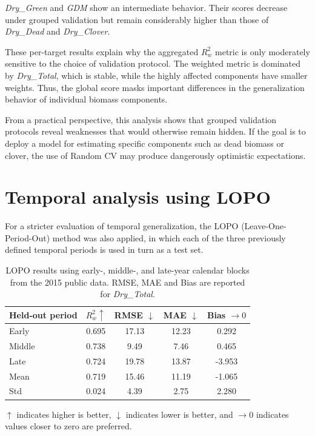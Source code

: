 \textit{Dry\_Green} and \textit{GDM} show an intermediate behavior. Their scores decrease under grouped validation but remain considerably higher than those of \textit{Dry\_Dead} and \textit{Dry\_Clover}.

These per-target results explain why the aggregated $R^2_w$ metric is only moderately sensitive to the choice of validation protocol. The weighted metric is dominated by \textit{Dry\_Total}, which is stable, while the highly affected components have smaller weights. Thus, the global score masks important differences in the generalization behavior of individual biomass components.

From a practical perspective, this analysis shows that grouped validation protocols reveal weaknesses that would otherwise remain hidden. If the goal is to deploy a model for estimating specific components such as dead biomass or clover, the use of Random CV may produce dangerously optimistic expectations.

\section{Temporal analysis using LOPO}

For a stricter evaluation of temporal generalization, the LOPO (Leave-One-Period-Out) method was also applied, in which each of the three previously defined temporal periods is used in turn as a test set.

\begin{table}[t]
\centering
\footnotesize
\caption{LOPO results using early-, middle-, and late-year calendar blocks from the 2015 public data. RMSE, MAE and Bias are reported for \textit{Dry\_Total}.}
\label{tab:lopo_summary}

\begin{threeparttable}
\begin{tabular}{lcccc} 
\hline 
Held-out period & $R^2_w \uparrow$ & RMSE $\downarrow$ & MAE $\downarrow$ & Bias $\rightarrow 0$ \\ 
\hline
Early  & 0.695 & 17.13 & 12.23 &  0.292 \\
Middle & 0.738 &  9.49 &  7.46 &  0.465 \\
Late   & 0.724 & 19.78 & 13.87 & -3.953 \\
\hline
Mean   & 0.719 & 15.46 & 11.19 & -1.065 \\
Std    & 0.024 &  4.39 &  2.75 &  2.280 \\
\hline
\end{tabular}

\begin{tablenotes} 
\footnotesize 
\item $\uparrow$ indicates higher is better, $\downarrow$ indicates lower is better, and $\rightarrow 0$ indicates values closer to zero are preferred. 
\end{tablenotes} 
\end{threeparttable}
\end{table}

